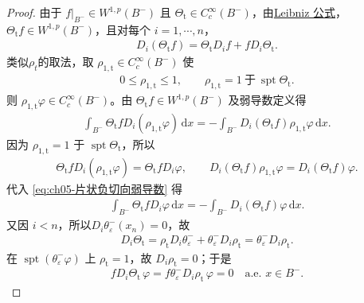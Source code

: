 \documentclass[../../main.tex]{subfiles}
\begin{document}
\begin{proof}
由于 $f|_{B^{-}}\in W^{1,p}(B^{-})$ 且 $\Theta_{\mathrm{t}}\in C_{c}^{\infty}(B^{-})$，由\hyperref[theorem:ch05-弱导数性质-4]{Leibniz 公式}，$\Theta_{\mathrm{t}}f\in W^{1,p}(B^{-})$，且对每个 $i=1,\cdots,n$，
\begin{align}
D_i(\Theta_{\mathrm{t}}f)=\Theta_{\mathrm{t}}D_if+fD_i\Theta_{\mathrm{t}}.
\label{eq:ch05-片状负切向乘积导数}
\end{align}
类似$\rho_t$的取法，取 $\rho_{1,\mathrm{t}}\in C_{c}^{\infty}(B^{-})$ 使
\begin{align}
0\leqslant\rho_{1,\mathrm{t}}\leqslant1,\qquad \rho_{1,\mathrm{t}}=1\ \text{于}\ \operatorname{spt}\Theta_{\mathrm{t}}.
\label{eq:ch05-片状负切向rho1}
\end{align}
则 $\rho_{1,\mathrm{t}}\varphi\in C_{c}^{\infty}(B^{-})$。由 $\Theta_{\mathrm{t}}f\in W^{1,p}(B^{-})$ 及弱导数定义得
\begin{align}
\int_{B^{-}}\Theta_{\mathrm{t}}fD_i(\rho_{1,\mathrm{t}}\varphi)\,\mathrm{d}x
=-\int_{B^{-}}D_i(\Theta_{\mathrm{t}}f)\rho_{1,\mathrm{t}}\varphi\,\mathrm{d}x.
\label{eq:ch05-片状负切向弱导数}
\end{align}
因为 $\rho_{1,\mathrm{t}}=1$ 于 $\operatorname{spt}\Theta_{\mathrm{t}}$，所以
\begin{align*}
\Theta_{\mathrm{t}}fD_i(\rho_{1,\mathrm{t}}\varphi)=\Theta_{\mathrm{t}}fD_i\varphi,\qquad
D_i(\Theta_{\mathrm{t}}f)\rho_{1,\mathrm{t}}\varphi=D_i(\Theta_{\mathrm{t}}f)\varphi.
\end{align*}
代入 \eqref{eq:ch05-片状负切向弱导数} 得
\begin{align}
\int_{B^{-}}\Theta_{\mathrm{t}}fD_i\varphi\,\mathrm{d}x
=-\int_{B^{-}}D_i(\Theta_{\mathrm{t}}f)\varphi\,\mathrm{d}x.
\label{eq:ch05-片状负切向Theta}
\end{align}
又因 $i<n$，所以$D_i\theta_{\varepsilon}^{-}(x_n)=0$，故
\begin{align*}
D_i\Theta_{\mathrm{t}}
=\rho_{\mathrm{t}}D_i\theta_{\varepsilon}^{-}
+\theta_{\varepsilon}^{-}D_i\rho_{\mathrm{t}}
=\theta_{\varepsilon}^{-}D_i\rho_{\mathrm{t}}.
\end{align*}
在 $\operatorname{spt}(\theta_{\varepsilon}^{-}\varphi)$ 上 $\rho_{\mathrm{t}}=1$，故 $D_i\rho_{\mathrm{t}}=0$；于是
\begin{align}
fD_i\Theta_{\mathrm{t}}\,\varphi
=f\theta_{\varepsilon}^{-}D_i\rho_{\mathrm{t}}\,\varphi=0
\quad\text{a.e. }x\in B^{-}.
\label{eq:ch05-片状负切向消失}
\end{align}


\end{proof}
\end{document}
